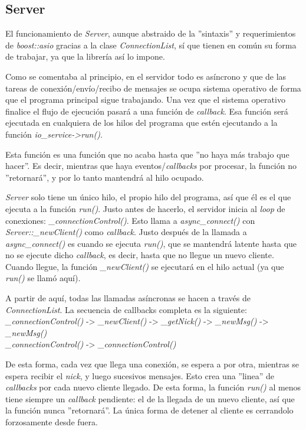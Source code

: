 \documentclass[a4paper,11pt,titlepage,halfparskip,cleardoubleempty]{scrbook}
\begin{document}
\subsection{Server}
   El funcionamiento de \textit{Server}, aunque abstraido de la ''sintaxis'' y requerimientos
   de \textit{boost::asio} gracias a la clase \textit{ConnectionList}, sí que tienen en común su forma
   de trabajar, ya que la librería así lo impone.

   Como se comentaba al principio, en el servidor todo es asíncrono y que de las tareas de conexión/envío/recibo de mensajes se ocupa sistema operativo de forma que el programa principal sigue trabajando. Una vez que el sistema operativo finalice el flujo de ejecución pasará a una función de \textit{callback}. Esa función será ejecutada
   en cualquiera de los hilos del programa que estén ejecutando a la función \textit{io\_service->run()}.

   Esta función es una función que no acaba hasta que ''no haya más trabajo que hacer''.
   Es decir, mientras que haya eventos/\textit{callbacks} por procesar, la función no ''retornará'', y por
   lo tanto mantendrá al hilo ocupado.

   \textit{Server} solo tiene un único hilo, el propio hilo del programa, así que él es el que ejecuta
   a la función \textit{run()}. Justo antes de hacerlo, el servidor inicia al \textit{loop} de conexiones: \textit{\_connectionControl()}.
   Esto llama a \textit{async\_connect()} con \textit{Server::\_newClient()} como \textit{callback}. Justo después de la llamada
   a \textit{async\_connect()} es cuando se ejecuta \textit{run()}, que se mantendrá latente hasta que no se ejecute dicho
   \textit{callback}, es decir, hasta que no llegue un nuevo cliente. Cuando llegue, la función \textit{\_newClient()}
   se ejecutará en el hilo actual (ya que \textit{run()} se llamó aquí).

   A partir de aquí, todas las llamadas asíncronas se hacen a través de \textit{ConnectionList}.
   La secuencia de callbacks completa es la siguiente:\\
 \textit{    \_connectionControl()} -> \textit{\_newClient()} -> \textit{\_getNick()} -> \textit{\_newMsg()} -> \textit{\_newMsg()}\\
 \textit{    \_connectionControl()} -> \textit{\_connectionControl()}

   De esta forma, cada vez que llega una conexión, se espera a por otra, mientras se espera
   recibir el \textit{nick}, y luego sucesivos mensajes. Esto crea una ''linea'' de \textit{callbacks} por cada
   nuevo cliente llegado. De esta forma, la función \textit{run()} al menos tiene siempre un \textit{callback}
   pendiente: el de la llegada de un nuevo cliente, así que la función nunca ''retornará''.
   La única forma de detener al cliente es cerrandolo forzosamente desde fuera.
\end{document}
